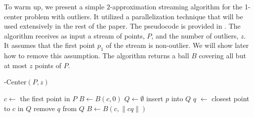 \documentclass[envcountsame]{cls/cccg15}
\DeclareMathOperator*{\argmin}{arg\,min}
\newcommand{\textproc}{\textsc}
\newcommand{\Call}[2]{\textsc{#1}(#2)}
\newcommand{\set}[1]{\left\{ #1 \right\}}
\newcommand{\len}[1]{\|{#1}\|}
\begin{document}
To warm up, we present a simple $2$-approximation streaming algorithm
for the 1-center problem with outliers.
It utilized a parallelization technique that 
will be used extensively in the rest of the paper.
The pseudocode is provided in .
The algorithm receives as input a stream of points, $P$,
and the number of outliers, $z$.
It assumes that the first point $p_1$ of the stream is non-outlier.
We will show later how to remove this assumption.
The algorithm returns a ball $B$ covering all but at most $z$ points of $P$.
%

%
%

\begin{algorithm}
\caption{-Center$(P, z)$} 
\label{alg:1-center}
\begin{algorithmic}[1]
	\STATE $c \gets$ the first point in $P$
	\STATE $B \gets B(c, 0)$
	\STATE $Q \gets \emptyset$
			\STATE insert $p$ into $Q$
				\STATE $q$ $\gets$ closest point to $c$ in $Q$
				\STATE remove $q$ from $Q$
				\STATE $B \gets B(c, \len{cq})$
			\ENDIF
		\ENDIF
	\ENDFOR
\end{algorithmic}
\end{algorithm}

\end{document}
